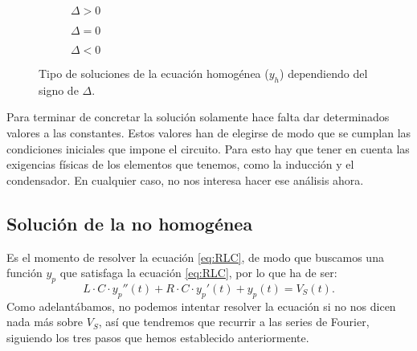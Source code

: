 \begin{figure}
\begin{figurebox}
    \vspace{10pt}
    \centering
      \begin{subfigure}{.3\textwidth}
          \centering
          \scalebox{0.25}{ }
          \caption{$\Delta>0$}
          \label{fig:a} 
      \end{subfigure} %
      \begin{subfigure}{.3\textwidth}
          \centering
          \scalebox{0.25}{}
          \caption{$\Delta=0$}
          \label{fig:b}
      \end{subfigure} %
      \begin{subfigure}{.3\textwidth}
          \centering
          \scalebox{0.25}{}
          \caption{$\Delta<0$}
          \label{fig:c}
      \end{subfigure}
      \caption{Tipo de soluciones de la ecuación homogénea ($y_h$) dependiendo del signo de $\Delta$.}
      \label{fig:SolucionesHomogenea}
    
\end{figurebox}
\end{figure}

Para terminar de concretar la solución solamente hace falta dar determinados valores a las constantes. Estos valores han de elegirse de modo que se cumplan las condiciones iniciales que impone el circuito. Para esto hay que tener en cuenta las exigencias físicas de los elementos que tenemos, como la inducción y el condensador. En cualquier caso, no nos interesa hacer ese análisis ahora.


\subsection{Solución de la no homogénea} 
Es el momento de resolver la ecuación \eqref{eq:RLC}, de modo que buscamos una función $y_p$ que satisfaga la ecuación \eqref{eq:RLC}, por lo que ha de ser:
\[
L\cdot C \cdot y_p '' (t) + R\cdot C\cdot y_p'(t) + y_p(t) = V_S(t).
\]
Como adelantábamos, no podemos intentar resolver la ecuación si no nos dicen nada más sobre $V_S$, así que tendremos que recurrir a las series de Fourier, siguiendo los tres pasos que hemos establecido anteriormente.

